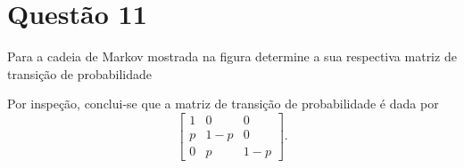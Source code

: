 \section{Questão 11}

Para a cadeia de Markov mostrada na figura determine a sua respectiva matriz de transição de probabilidade
%
\begin{figure}[htbp]
    \centering
\end{figure}

\begin{respostas}
    Por inspeção, conclui-se que a matriz de transição de probabilidade é dada por
    $$\begin{bmatrix}
        1 & 0 & 0 \\
        p & 1-p & 0 \\
        0 & p & 1-p
    \end{bmatrix}.$$
\end{respostas}